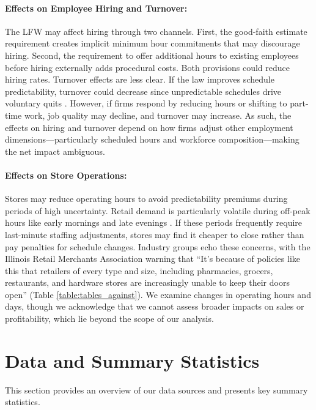 \documentclass[letterpaper,11pt,leqno]{article}
\theoremstyle{paper}
\begin{document}
\paragraph{Effects on Employee Hiring and Turnover:}
The LFW may affect hiring through two channels. First, the good-faith estimate requirement creates implicit minimum hour commitments that may discourage hiring. Second, the requirement to offer additional hours to existing employees before hiring externally adds procedural costs. Both provisions could reduce hiring rates. Turnover effects are less clear. If the law improves schedule predictability, turnover could decrease since unpredictable schedules drive voluntary quits \citep{schneider2019consequences,lambert_predictability}. However, if firms respond by reducing hours or shifting to part-time work, job quality may decline, and turnover may increase. As such, the effects on hiring and turnover depend on how firms adjust other employment dimensions—particularly scheduled hours and workforce composition—making the net impact ambiguous. 


\paragraph{Effects on Store Operations:}
Stores may reduce operating hours to avoid predictability premiums during periods of high uncertainty. Retail demand is particularly volatile during off-peak hours like early mornings and late evenings \citep{netessine_traffic,kesavan_traffic}. If these periods frequently require last-minute staffing adjustments, stores may find it cheaper to close rather than pay penalties for schedule changes. Industry groups echo these concerns, with the Illinois Retail Merchants Association warning that ``It's because of policies like this that retailers of every type and size, including pharmacies, grocers, restaurants, and hardware stores are increasingly unable to keep their doors open'' (Table \ref{table:tables_against}). We examine changes in operating hours and days, though we acknowledge that we cannot assess broader impacts on sales or profitability, which lie beyond the scope of our analysis.
\section{Data and Summary Statistics} \label{sec:data}

This section provides an overview of our data sources and presents key summary statistics. 
\end{document}
